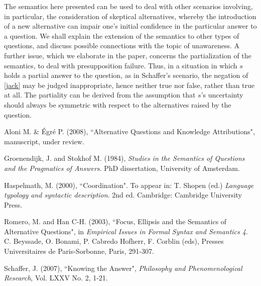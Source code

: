 \documentclass[times,10pt,twocolumn]{article}
\begin{document}




The semantics here presented can be used to deal with other
scenarios involving, in particular, the consideration of skeptical
alternatives, whereby the introduction of a new alternative can
impair one's initial confidence in the particular answer to a
question. We shall explain the extension of the semantics to other
types of questions, and discuss possible connections with the
topic of unawareness. A further issue, which we elaborate in the
paper, concerns the partialization of the semantics, to deal with
presupposition failure. Thus, in a situation in which $s$ holds a
partial answer to the question, as in Schaffer's scenario, the
negation of \ref{jack} may be judged inappropriate, hence neither
true nor false, rather than true at all. The partiality can be
derived from the assumption that $s$'s uncertainty should always
be symmetric with respect to the alternatives raised by the
question.

\begin{thebibliography}{0}

 Aloni M. \& \'Egr\'e P. (2008), ``Alternative
Questions and Knowledge Attributions", manuscript, under review.

 Groenendijk, J. and Stokhof M. (1984), \emph{Studies
in the Semantics of Questions and the Pragmatics of Answers}. PhD
dissertation, University of Amsterdam.


 Haspelmath, M. (2000),
``Coordination". To appear in: T. Shopen (ed.) \emph{Language
typology and syntactic description}. 2nd ed. Cambridge: Cambridge
University Press.

 Romero, M. and Han C-H. (2003), ``Focus, Ellipsis and
the Semantics of Alternative Questions", in \emph{Empirical Issues
in Formal Syntax and Semantics 4}. C. Beyssade, O. Bonami, P.
Cabredo Hofherr, F. Corblin (eds), Presses Universitaires de
Paris-Sorbonne, Paris, 291-307.

 Schaffer, J. (2007), ``Knowing the Answer",
\emph{Philosophy and Phenomenological Research}, Vol. LXXV No. 2,
1-21.

\end{thebibliography}
\end{document}
